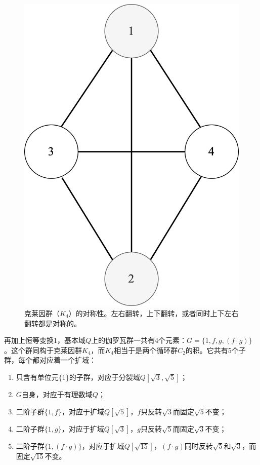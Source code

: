 \documentclass[b5paper]{ctexart}
\begin{document}
\begin{figure}[htbp]
\centering
\includegraphics[scale=0.4]{img/K4}
\caption{克莱因群（$K_4$）的对称性。左右翻转，上下翻转，或者同时上下左右翻转都是对称的。}
\label{fig:Klein-four-group}
\end{figure}

再加上恒等变换1，基本域$Q$上的伽罗瓦群一共有4个元素：$G = \{1, f, g, (f \cdot g)\}$。这个群同构于克莱因群$K_4$，而$K_4$相当于是两个循环群$C_2$的积。它共有5个子群，每个都对应着一个扩域：

\begin{enumerate}
\item 只含有单位元$\{1\}$的子群，对应于分裂域$Q[\sqrt{3}, \sqrt{5}]$；
\item $G$自身，对应于有理数域$Q$；
\item 二阶子群$\{1, f\}$，对应于扩域$Q[\sqrt{5}]$，$f$只反转$\sqrt{3}$而固定$\sqrt{5}$不变；
\item 二阶子群$\{1, g\}$，对应于扩域$Q[\sqrt{3}]$，$g$只反转$\sqrt{5}$而固定$\sqrt{3}$不变；
\item 二阶子群$\{1, (f \cdot g)\}$，对应于扩域$Q[\sqrt{15}]$，$(f \cdot g)$同时反转$\sqrt{5}$和$\sqrt{3}$，而固定$\sqrt{15}$不变。
\end{enumerate}
\end{document}
